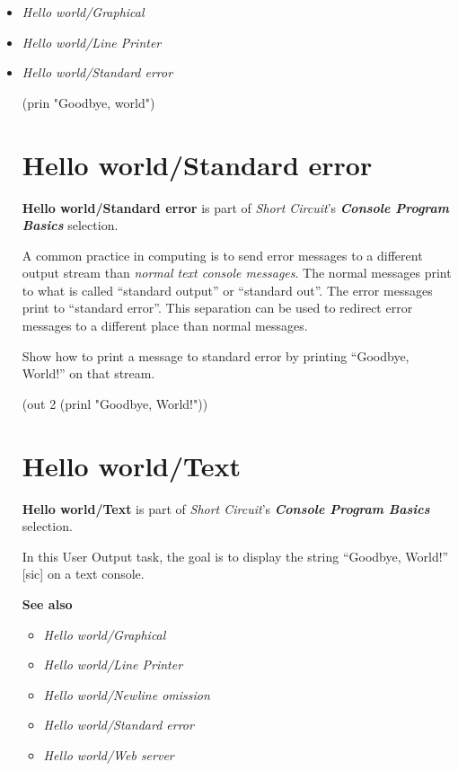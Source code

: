 \begin{itemize}
\item
  \emph{Hello world/Graphical}
\item
  \emph{Hello world/Line Printer}
\item
  \emph{Hello world/Standard error}

\begin{wideverbatim}

(prin "Goodbye, world")

\end{wideverbatim}

\pagebreak{}
\section*{Hello world/Standard error}

\textbf{Hello world/Standard error} is part of \emph{Short Circuit}'s
\textbf{\emph{Console
    Program Basics}} selection.

A common practice in computing is to send error messages to a
different output stream than \emph{normal text console messages}. The
normal messages print to what is called ``standard output'' or
``standard out''. The error messages print to ``standard error''. This
separation can be used to redirect error messages to a different place
than normal messages.

Show how to print a message to standard error by printing ``Goodbye,
World!'' on that stream.

\begin{wideverbatim}

(out 2 (prinl "Goodbye, World!"))

\end{wideverbatim}

\pagebreak{}
\section*{Hello world/Text}

\textbf{Hello world/Text} is part of \emph{Short Circuit}'s
\textbf{\emph{Console Program Basics}} selection.

In this User Output task, the goal is to display the string ``Goodbye,
World!'' {[}sic{]} on a text console.

\textbf{See also}

\begin{itemize}
\item \emph{Hello world/Graphical}
\item \emph{Hello world/Line Printer}
\item \emph{Hello world/Newline omission}
\item \emph{Hello world/Standard error}
\item \emph{Hello world/Web server}
\end{itemize}


\end{itemize}
